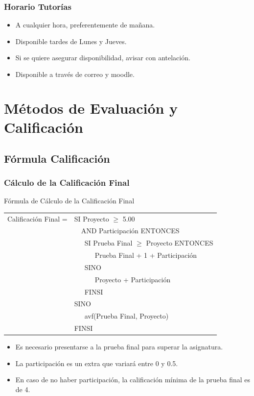 \documentclass[handout,a4paper,slidestop,xcolor=pst,dvips,blue]{beamer}
\begin{document}
\begin{frame}[c]
	\frametitle{Horario Tutorías}
    \begin{itemize}[<+->]
        \item A cualquier hora, preferentemente de mañana.
        \item Disponible tardes de Lunes y Jueves.
        \item Si se quiere asegurar disponibilidad, avisar con antelación.
        \item Disponible a través de correo y \alert{moodle}.
	\end{itemize}
\end{frame}

\section{Métodos de Evaluación y Calificación}

\subsection{Fórmula Calificación}

\begin{frame}[c]
	\frametitle{Cálculo de la Calificación Final}
	\begin{block}{Fórmula de Cálculo de la Calificación Final}
		\begin{scriptsize}
        \begin{tabular}{ll}
			Calificación Final = & SI Proyecto $\geq$ 5.00 \\
                                 & \ \ AND Participación ENTONCES \\
                                 & \ \ \ SI Prueba Final  $\geq$ Proyecto ENTONCES \\
                                 & \ \ \ \ \ \ Prueba Final + 1 + Participación \\
                                 & \ \ \ SINO \\
                                 & \ \ \ \ \ \ Proyecto + Participación \\
                                 & \ \ \ FINSI \\
                                 & SINO \\
                                 & \ \ \ avf(Prueba Final, Proyecto)  \\
                                 & FINSI \\
		\end{tabular}
        \end{scriptsize}
	\end{block}
	\begin{itemize}
		\item<2-> Es necesario presentarse a la prueba final para superar la asignatura.
        \item<3-> La participación es un extra que variará entre 0 y 0.5.
        \item<4-> En caso de no haber participación, la calificación mínima de la prueba final es de 4.
	\end{itemize}
\end{frame}
\end{document}
